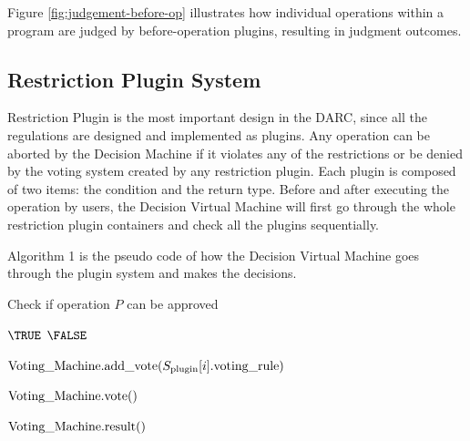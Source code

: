 \documentclass[main.tex]{subfiles}
\begin{document}
Figure \ref{fig:judgement-before-op} illustrates how individual operations within a program are judged by before-operation plugins, resulting in judgment outcomes.











\subsection{Restriction Plugin System}

Restriction Plugin is the most important design in the DARC, since all the regulations are designed and implemented as plugins. Any operation can be aborted by the Decision Machine if it violates any of the restrictions or be denied by the voting system created by any restriction plugin. Each plugin is composed of two items: the condition and the return type. Before and after executing the operation by users, the Decision Virtual Machine will first go through the whole restriction plugin containers and check all the plugins sequentially. 



Algorithm 1 is the pseudo code of how the Decision Virtual Machine goes through the plugin system and makes the decisions.


\begin{algorithm}
\caption{Check if operation $P$ can be approved}
\begin{algorithmic} 


\RETURN $ \TRUE $
\RETURN $ \FALSE $
\ENDIF
\ENDFOR



\STATE ${\text{Voting\textunderscore Machine.add\textunderscore vote(}} S_{\text{plugin}} [i].\text{voting\textunderscore rule} \text{)} $
\ENDIF
\ENDFOR

\STATE $\text{Voting\textunderscore Machine.vote()} $

\RETURN $ \text{Voting\textunderscore Machine.result()} $ 
\end{algorithmic}
\end{algorithm}
\end{document}
